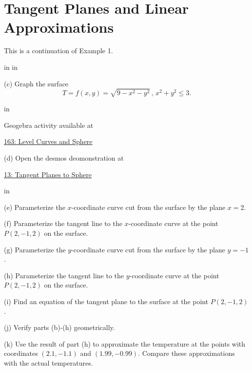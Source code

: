 \documentclass{ximera}
\newcommand{\pskip}{\vskip 0.1 in}
\begin{document}
\section{Tangent Planes and Linear Approximations}


\begin{example}  \label{Esdtr435r}
This is a continuation of Example 1. 

\pskip \pskip

(c) Graph the surface
\[
  T = f(x,y) = \sqrt{9-x^2-y^2} \, , \, x^2 + y^2 \leq 3 .
\]

\pskip

 
\begin{onlineOnly}
    \begin{center}
\end{center}
\end{onlineOnly}

Geogebra activity available at

\href{https://www.geogebra.org/classic/egnkjkqw}{163: Level Curves and Sphere}




(d) Open the desmos deomonstration at

\href{https://www.desmos.com/3d/d78d5a3138}{13: Tangent Planes to Sphere}

\pskip

(e) Parameterize the $x$-coordinate curve cut from the surface by the plane $x=2$.

(f) Parameterize the tangent line to the $x$-coordinate curve at the point $P(2,-1,2)$ on the surface.

(g) Parameterize the $y$-coordinate curve cut from the surface by the plane $y=-1$.

(h) Parameterize the tangent line to the $y$-coordinate curve at the point $P(2,-1,2)$ on the surface.

(i) Find an equation of the tangent plane to the surface at the point $P(2,-1,2)$.

(j) Verify parts (b)-(h) geometrically.

(k) Use the result of part (h) to approximate the temperature at the points with coordinates $(2.1, -1.1)$ and $(1.99, -0.99)$. Compare these approximations with the actual temperatures.

\end{example}
\end{document}
